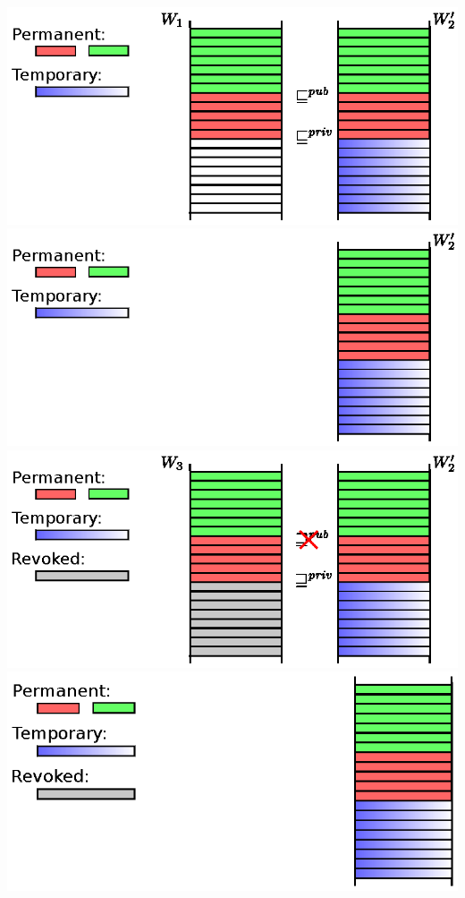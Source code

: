 \documentclass{beamer}
\begin{document}
\begin{frame}
\begin{overprint}
    \includegraphics{Worlds/w4.eps}
    \includegraphics{Worlds/w5.eps}
    \includegraphics{Worlds/w6.eps}
    \includegraphics{Worlds/w7.eps}

\end{overprint}
\end{frame}
\end{document}
